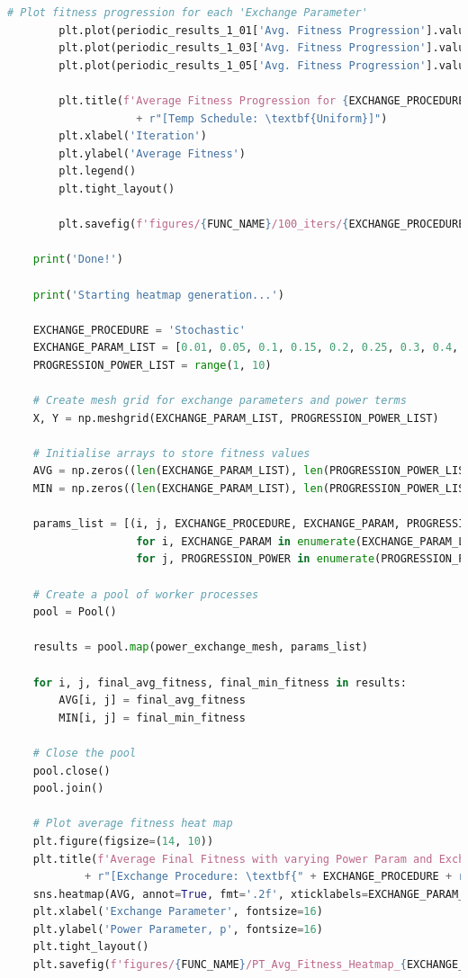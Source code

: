 \documentclass[10pt]{article}
\begin{document}
\begin{lstlisting}[language=Python, caption=PT\_TuningExperiments.py, label=PT_TuningExperimentspy]
        # Plot fitness progression for each 'Exchange Parameter'
        plt.plot(periodic_results_1_01['Avg. Fitness Progression'].values[0], label='Exchange Parameter = 0.1')
        plt.plot(periodic_results_1_03['Avg. Fitness Progression'].values[0], label='Exchange Parameter = 0.3')
        plt.plot(periodic_results_1_05['Avg. Fitness Progression'].values[0], label='Exchange Parameter = 0.5')
    
        plt.title(f'Average Fitness Progression for {EXCHANGE_PROCEDURE} Exchange, \n'
                    + r"[Temp Schedule: \textbf{Uniform}]")
        plt.xlabel('Iteration')
        plt.ylabel('Average Fitness')
        plt.legend()
        plt.tight_layout()
    
        plt.savefig(f'figures/{FUNC_NAME}/100_iters/{EXCHANGE_PROCEDURE}/PT_Avg_Fitness_Evolution.png')
    
    print('Done!')  
    
    print('Starting heatmap generation...')
    
    EXCHANGE_PROCEDURE = 'Stochastic'
    EXCHANGE_PARAM_LIST = [0.01, 0.05, 0.1, 0.15, 0.2, 0.25, 0.3, 0.4, 0.5]
    PROGRESSION_POWER_LIST = range(1, 10)
    
    # Create mesh grid for exchange parameters and power terms
    X, Y = np.meshgrid(EXCHANGE_PARAM_LIST, PROGRESSION_POWER_LIST)
    
    # Initialise arrays to store fitness values
    AVG = np.zeros((len(EXCHANGE_PARAM_LIST), len(PROGRESSION_POWER_LIST)))
    MIN = np.zeros((len(EXCHANGE_PARAM_LIST), len(PROGRESSION_POWER_LIST)))
    
    params_list = [(i, j, EXCHANGE_PROCEDURE, EXCHANGE_PARAM, PROGRESSION_POWER)
                    for i, EXCHANGE_PARAM in enumerate(EXCHANGE_PARAM_LIST)
                    for j, PROGRESSION_POWER in enumerate(PROGRESSION_POWER_LIST)]
    
    # Create a pool of worker processes
    pool = Pool()
    
    results = pool.map(power_exchange_mesh, params_list)
    
    for i, j, final_avg_fitness, final_min_fitness in results:
        AVG[i, j] = final_avg_fitness
        MIN[i, j] = final_min_fitness
    
    # Close the pool
    pool.close()
    pool.join()
    
    # Plot average fitness heat map
    plt.figure(figsize=(14, 10))
    plt.title(f'Average Final Fitness with varying Power Param and Exchange Param on {FUNC_NAME} Function \n' 
            + r"[Exchange Procedure: \textbf{" + EXCHANGE_PROCEDURE + r"}]", fontsize=18)
    sns.heatmap(AVG, annot=True, fmt='.2f', xticklabels=EXCHANGE_PARAM_LIST, yticklabels=PROGRESSION_POWER_LIST, cmap='Blues')
    plt.xlabel('Exchange Parameter', fontsize=16)
    plt.ylabel('Power Parameter, p', fontsize=16)
    plt.tight_layout()
    plt.savefig(f'figures/{FUNC_NAME}/PT_Avg_Fitness_Heatmap_{EXCHANGE_PROCEDURE}.png')
    

\end{lstlisting}
\end{document}
